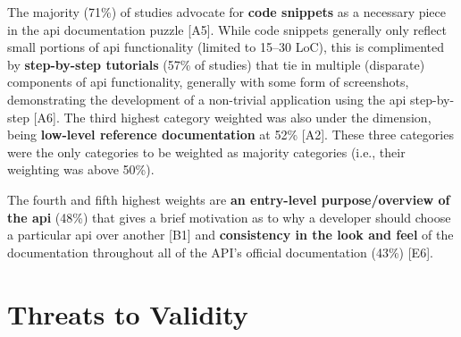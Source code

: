 The majority (71\%) of studies advocate for \textbf{code snippets} as a necessary piece in the \gls{api} documentation puzzle [A5]. While code snippets generally only reflect small portions of \gls{api} functionality (limited to 15--30 LoC), this is complimented by \textbf{step-by-step tutorials} (57\% of studies) that tie in multiple (disparate) components of \gls{api} functionality, generally with some form of screenshots, demonstrating the development of a non-trivial application using the \gls{api} step-by-step [A6]. The third highest category weighted was also under the \dima{} dimension, being \textbf{low-level reference documentation} at 52\% [A2]. These three categories were the only categories to be weighted as majority categories (i.e., their weighting was above 50\%).

The fourth and fifth highest weights are \textbf{an entry-level purpose/overview of the \gls{api}} (48\%) that gives a brief motivation as to why a developer should choose a particular \gls{api} over another [B1] and \textbf{consistency in the look and feel} of the documentation throughout all of the API's official documentation (43\%) [E6].



 
\section{Threats to Validity}
\label{esem2019:sec:limitations}


